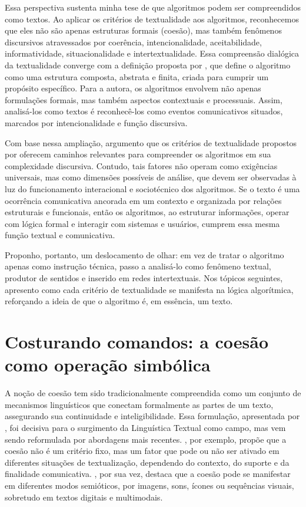 \documentclass[portuguese]{textolivre}
\begin{document}
Essa perspectiva sustenta minha tese de que algoritmos podem ser compreendidos como textos. Ao aplicar os critérios de textualidade aos algoritmos, reconhecemos que eles não são apenas estruturas formais (coesão), mas também fenômenos discursivos atravessados por coerência, intencionalidade, aceitabilidade, informatividade, situacionalidade e intertextualidade. Essa compreensão dialógica da textualidade converge com a definição proposta por \textcite{hill2016}, que define o algoritmo como uma estrutura composta, abstrata e finita, criada para cumprir um propósito específico. Para a autora, os algoritmos envolvem não apenas formulações formais, mas também aspectos contextuais e processuais. Assim, analisá-los como textos é reconhecê-los como eventos comunicativos situados, marcados por intencionalidade e função discursiva.

Com base nessa ampliação, argumento que os critérios de textualidade propostos por \textcite{halliday1976,beaugrande1981} oferecem caminhos relevantes para compreender os algoritmos em sua complexidade discursiva. Contudo, tais fatores não operam como exigências universais, mas como dimensões possíveis de análise, que devem ser observadas à luz do funcionamento interacional e sociotécnico dos algoritmos. Se o texto é uma ocorrência comunicativa ancorada em um contexto e organizada por relações estruturais e funcionais, então os algoritmos, ao estruturar informações, operar com lógica formal e interagir com sistemas e usuários, cumprem essa mesma função textual e comunicativa.

Proponho, portanto, um deslocamento de olhar: em vez de tratar o algoritmo apenas como instrução técnica, passo a analisá-lo como fenômeno textual, produtor de sentidos e inserido em redes intertextuais. Nos tópicos seguintes, apresento como cada critério de textualidade se manifesta na lógica algorítmica, reforçando a ideia de que o algoritmo é, em essência, um texto.


\section{Costurando comandos: a coesão como operação simbólica}\label{sec-formato}
A noção de coesão tem sido tradicionalmente compreendida como um conjunto de mecanismos linguísticos que conectam formalmente as partes de um texto, assegurando sua continuidade e inteligibilidade. Essa formulação, apresentada por \textcite{halliday1976}, foi decisiva para o surgimento da Linguística Textual como campo, mas vem sendo reformulada por abordagens mais recentes. \textcite{koch2006}, por exemplo, propõe que a coesão não é um critério fixo, mas um fator que pode ou não ser ativado em diferentes situações de textualização, dependendo do contexto, do suporte e da finalidade comunicativa. \textcite{marcuschi2008}, por sua vez, destaca que a coesão pode se manifestar em diferentes modos semióticos, por imagens, sons, ícones ou sequências visuais, sobretudo em textos digitais e multimodais.
\end{document}
